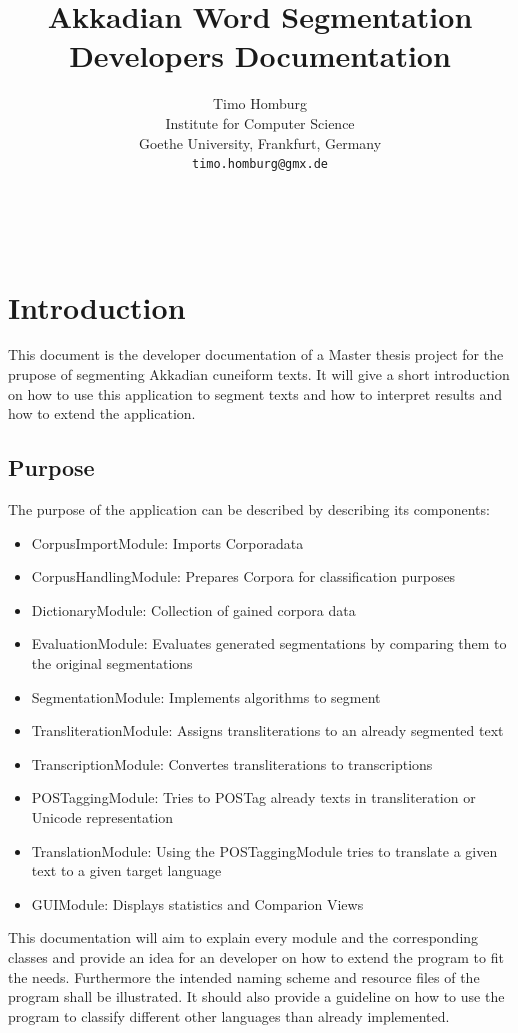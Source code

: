 \documentclass[10pt,a4paper,titlepage]{report}
\title{Akkadian Word Segmentation\\ Developers Documentation}
\author{Timo Homburg \\
	Institute for Computer Science\\
	Goethe University, Frankfurt, Germany \\
	{\tt timo.homburg@gmx.de}}
\begin{document}
	\maketitle
	\tableofcontents
	\ \\
	\chapter{Introduction}
	This document is the developer documentation of a Master thesis project for the prupose of segmenting Akkadian cuneiform texts. It will give a short introduction on how to use this application to segment texts and how to interpret results and how to extend the application.
	\section{Purpose}
	The purpose of the application can be described by describing its components:
	\begin{itemize}
		\item CorpusImportModule: Imports Corporadata
		\item CorpusHandlingModule: Prepares Corpora for classification purposes
		\item DictionaryModule: Collection of gained corpora data
		\item EvaluationModule: Evaluates generated segmentations by comparing them to the original segmentations
		\item SegmentationModule: Implements algorithms to segment
		\item TransliterationModule: Assigns transliterations to an already segmented text
		\item TranscriptionModule: Convertes transliterations to transcriptions
		\item POSTaggingModule: Tries to POSTag already texts in transliteration or Unicode representation
		\item TranslationModule: Using the POSTaggingModule tries to translate a given text to a given target language
		\item GUIModule: Displays statistics and Comparion Views 
	\end{itemize}
	This documentation will aim to explain every module and the corresponding classes and provide an idea for an developer on how to extend the program to fit the needs. Furthermore the intended naming scheme and resource files of the program shall be illustrated. It should also provide a guideline on how to use the program to classify different other languages than already implemented. 
\end{document}

